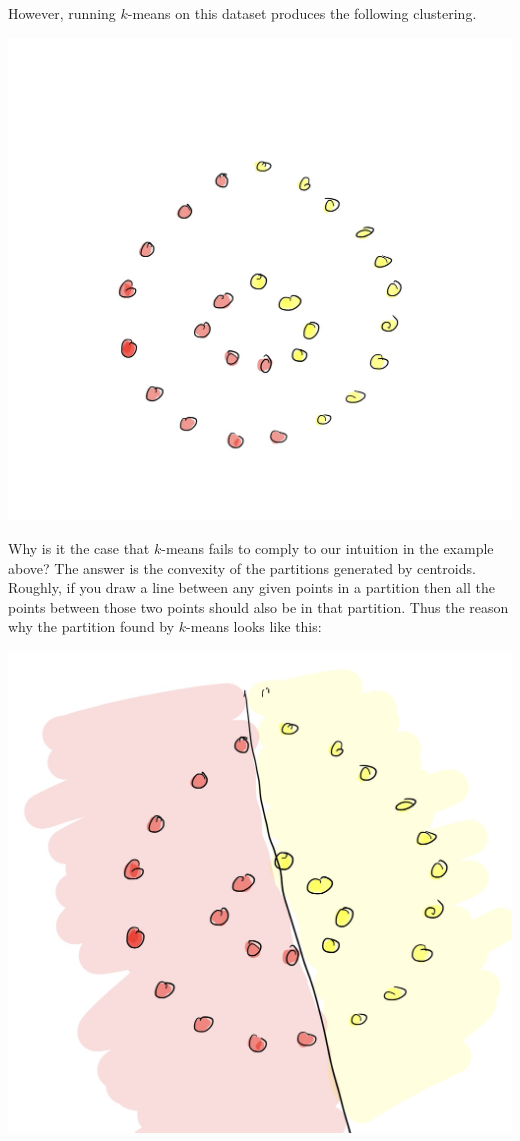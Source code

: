 However, running $k$-means on this dataset produces the following clustering.

\begin{center}
\includegraphics[width=.7\linewidth]{chapter_2/images/kmeans.jpg}
\end{center}

Why is it the case that $k$-means fails to comply to our intuition in the example
above? The answer is the convexity of the partitions generated by centroids. Roughly,
if you draw a line between any given points in a partition then all the points
between those two points should also be in that partition. Thus the reason
why the partition found by $k$-means looks like this:

\begin{center}
\includegraphics[width=.7\linewidth]{chapter_2/images/voronoi-cell.jpg}
\end{center}

